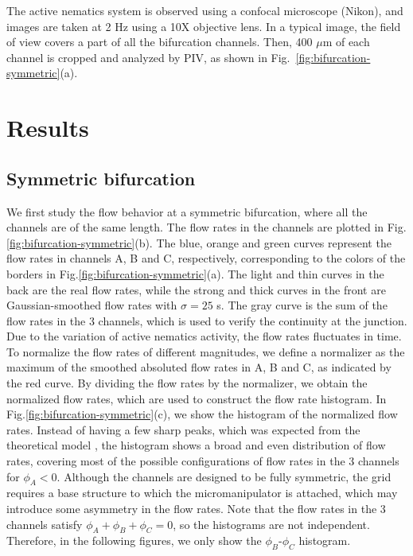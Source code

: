 \documentclass[%
10pt,
superscriptaddress,
twocolumn,
 amsmath,amssymb,
 aps,prx,
]{revtex4-2}
\begin{document}
The active nematics system is observed using a confocal microscope (Nikon), and images are taken at 2 Hz using a 10X objective lens.
In a typical image, the field of view covers a part of all the bifurcation channels.
Then, 400 $\mu$m of each channel is cropped and analyzed by PIV, as shown in Fig.~\ref{fig:bifurcation-symmetric}(a).

\section{Results}

\subsection{Symmetric bifurcation}

We first study the flow behavior at a symmetric bifurcation, where all the channels are of the same length.
The flow rates in the channels are plotted in Fig.\ref{fig:bifurcation-symmetric}(b).
The blue, orange and green curves represent the flow rates in channels A, B and C, respectively, corresponding to the colors of the borders in Fig.\ref{fig:bifurcation-symmetric}(a).
The light and thin curves in the back are the real flow rates, while the strong and thick curves in the front are Gaussian-smoothed flow rates with $\sigma=25$ s.
The gray curve is the sum of the flow rates in the 3 channels, which is used to verify the continuity at the junction.
Due to the variation of active nematics activity, the flow rates fluctuates in time. 
To normalize the flow rates of different magnitudes, we define a normalizer as the maximum of the smoothed absoluted flow rates in A, B and C, as indicated by the red curve. 
By dividing the flow rates by the normalizer, we obtain the normalized flow rates, which are used to construct the flow rate histogram.
In Fig.\ref{fig:bifurcation-symmetric}(c), we show the histogram of the normalized flow rates.
Instead of having a few sharp peaks, which was expected from the theoretical model \cite{Woodhouse2017}, the histogram shows a broad and even distribution of flow rates, covering most of the possible configurations of flow rates in the 3 channels for $\phi_A<0$.
Although the channels are designed to be fully symmetric, the grid requires a base structure to which the micromanipulator is attached, which may introduce some asymmetry in the flow rates.
Note that the flow rates in the 3 channels satisfy $\phi_A+\phi_B+\phi_C = 0$, so the histograms are not independent.
Therefore, in the following figures, we only show the $\phi_B$-$\phi_C$ histogram.
\end{document}
